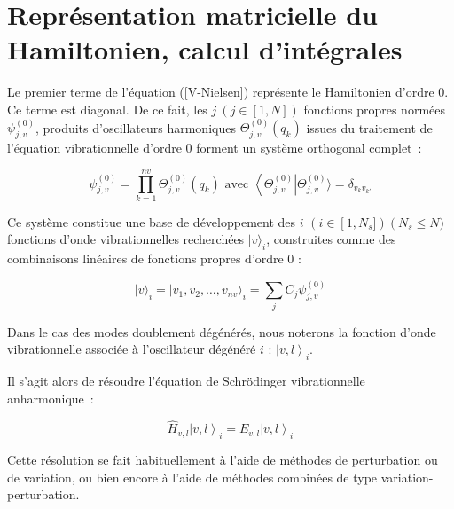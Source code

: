 \documentclass[12pt,a4paper]{book}
\begin{document}
\section[Représentation matricielle du Hamiltonien]{Représentation matricielle du Hamiltonien, calcul d'intégrales}

Le premier terme de l'équation (\ref{V-Nielsen}) représente le Hamiltonien d'ordre 0. Ce terme est diagonal. De ce fait, les $j \ \left(j\in\left[1,N\right]\right)$ fonctions propres normées $\psi^{(0)}_{j,v}$, produits  d'oscillateurs harmoniques $\Theta^{(0)}_{j,v}(q_k)$ issues du traitement de l'équation vibrationnelle d'ordre 0 forment un système orthogonal complet~:

\begin{equation}
\psi^{(0)}_{j,v} = \prod^{nv}_{k=1} \Theta^{(0)}_{j,v}(q_k) \text{ avec } \left\langle \Theta^{(0)}_{j,v} \right| \Theta^{(0)}_{j,v} \rangle = \delta_{v_k v_{k'}}
\end{equation}

Ce système constitue une base de développement des $i$ $\left(i\in\left[1, N_s\right.]\right) \left(N_s\leq N\right.)$ fonctions d'onde vibrationnelles recherchées $\left.|v\right.\rangle_i$, construites comme des combinaisons linéaires de fonctions propres d'ordre 0 :

\begin{equation}
\left.|v\right.\rangle_i = \left.|v_1, v_2, \ldots, v_{nv}\right.\rangle_i = \sum_j C_j \psi^{(0)}_{j,v}
\end{equation}

Dans le cas des modes doublement dégénérés, nous noterons la fonction d'onde vibrationnelle associée à l'oscillateur dégénéré $i$ : $\left.\left.\right|v,l\right\rangle_i$.

Il s'agit alors de résoudre l'équation de Schr\"{o}dinger vibrationnelle anharmonique~:

\begin{equation} \label{Eq-Schrod-anhar}
\hat{H}_{v,l} \left.\left.\right|v,l\right\rangle_i = E_{v,l} \left.\left.\right|v,l\right\rangle_i
\end{equation}

Cette résolution se fait habituellement à l'aide de méthodes de perturbation ou de variation, ou bien encore à l'aide de méthodes combinées de type variation-perturbation.
\end{document}
